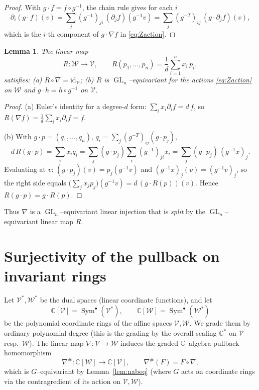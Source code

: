 \documentclass{amsart}
\newtheorem{lemma}{Lemma}
\theoremstyle{definition}
\DeclareMathOperator{\GL}{GL}
\DeclareMathOperator{\Sym}{Sym}
\newcommand{\CC}{\mathbb{C}}
\newcommand{\nab}{\nabla}
\begin{document}
\begin{proof}
With $g\cdot f=f\circ g^{-1}$, the chain rule gives for each $i$
\[
\partial_i(g\cdot f)(v)=\sum_j (g^{-1})_{ji}\,(\partial_j f)(g^{-1}v)
=\sum_j (g^{-T})_{ij}\,(g\cdot\partial_j f)(v),
\]
which is the $i$-th component of $g\cdot\nab f$ in \eqref{eq:Zaction}.
\end{proof}

\begin{lemma}\label{lem:euler}
The linear map
\[
R\colon \mathcal W\to\mathcal V,\qquad R(p_1,\dots,p_n)=\frac1d\sum_{i=1}^n x_i\,p_i,
\]
satisfies:
\textup{(a)} $R\circ\nab=\mathrm{id}_{\mathcal V}$;
\textup{(b)} $R$ is $\GL_n$--equivariant for the actions \eqref{eq:Zaction} on $\mathcal W$
and $g\cdot h=h\circ g^{-1}$ on $\mathcal V$.
\end{lemma}

\begin{proof}
(a) Euler's identity for a degree-$d$ form: $\sum_i x_i\partial_i f=d\,f$, so
$R(\nab f)=\tfrac1d\sum_i x_i\partial_i f=f$.

(b) With $g\cdot p=(q_1,\dots,q_n)$, $q_i=\sum_j(g^{-T})_{ij}(g\cdot p_j)$,
\[
d\,R(g\cdot p)=\sum_i x_i q_i=\sum_j (g\cdot p_j)\sum_i (g^{-1})_{ji}x_i
=\sum_j (g\cdot p_j)\,(g^{-1}x)_j .
\]
Evaluating at $v$: $(g\cdot p_j)(v)=p_j(g^{-1}v)$ and $(g^{-1}x)_j(v)=(g^{-1}v)_j$, so the
right side equals $\big(\sum_j x_j p_j\big)(g^{-1}v)=d\,(g\cdot R(p))(v)$. Hence
$R(g\cdot p)=g\cdot R(p)$.
\end{proof}

Thus $\nab$ is a $\GL_n$--equivariant linear injection that is \emph{split} by the
$\GL_n$--equivariant linear map $R$.

\section{Surjectivity of the pullback on invariant rings}\label{sec:inv}

Let $\mathcal V^{*},\mathcal W^{*}$ be the dual spaces (linear coordinate functions), and let
\[
\CC[\mathcal V]=\Sym^{\bullet}(\mathcal V^{*}),\qquad \CC[\mathcal W]=\Sym^{\bullet}(\mathcal W^{*})
\]
be the polynomial coordinate rings of the affine spaces $\mathcal V,\mathcal W$. We grade them
by ordinary polynomial degree (this is the grading by the overall scaling $\CC^{*}$ on
$\mathcal V$ resp.\ $\mathcal W$). The linear map $\nab\colon \mathcal V\to\mathcal W$ induces
the graded $\CC$--algebra pullback homomorphism
\[
\nab^{\#}\colon \CC[\mathcal W]\to\CC[\mathcal V],\qquad \nab^{\#}(F)=F\circ\nab,
\]
which is $G$--equivariant by Lemma~\ref{lem:nabeq} (where $G$ acts on coordinate rings via the
contragredient of its action on $\mathcal V,\mathcal W$).
\end{document}
